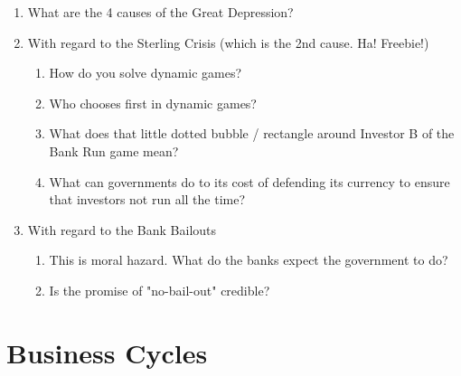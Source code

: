 \documentclass[11pt]{scrartcl}
\begin{document}
\begin{enumerate}
\item What are the 4 causes of the Great Depression?
\item With regard to the Sterling Crisis (which is the 2nd cause. Ha! Freebie!)
\begin{enumerate}
\item How do you solve dynamic games?
\item Who chooses first in dynamic games?
\item What does that little dotted bubble / rectangle around Investor B of the Bank Run game mean?
\item What can governments do to its cost of defending its currency to ensure that investors not run all the time?
\end{enumerate}
\item With regard to the Bank Bailouts
\begin{enumerate}
\item This is moral hazard. What do the banks expect the government to do?
\item Is the promise of "no-bail-out" credible?
\end{enumerate}
\end{enumerate}

\section{Business Cycles}
\end{document}
